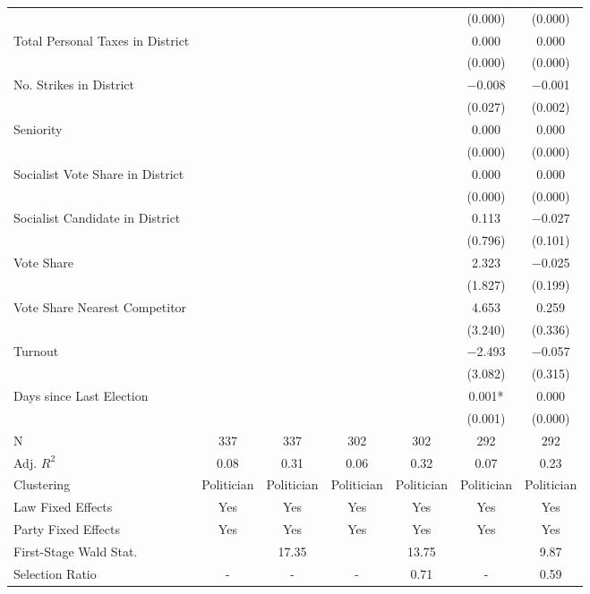 \begin{table}[!h]
{\begin{threeparttable}
\begin{tabular}[t]{lcccccc}
 &  &  &  &  & (\num{0.000}) & \vphantom{3} (\num{0.000})\\
Total Personal Taxes in District &  &  &  &  & \num{0.000} & \num{0.000}\\
 &  &  &  &  & (\num{0.000}) & \vphantom{2} (\num{0.000})\\
No. Strikes in District &  &  &  &  & \num{-0.008} & \num{-0.001}\\
 &  &  &  &  & (\num{0.027}) & (\num{0.002})\\
Seniority &  &  &  &  & \num{0.000} & \num{0.000}\\
 &  &  &  &  & (\num{0.000}) & \vphantom{1} (\num{0.000})\\
Socialist Vote Share in District &  &  &  &  & \num{0.000} & \num{0.000}\\
 &  &  &  &  & (\num{0.000}) & (\num{0.000})\\
Socialist Candidate in District &  &  &  &  & \num{0.113} & \num{-0.027}\\
 &  &  &  &  & (\num{0.796}) & (\num{0.101})\\
Vote Share &  &  &  &  & \num{2.323} & \num{-0.025}\\
 &  &  &  &  & (\num{1.827}) & (\num{0.199})\\
Vote Share Nearest Competitor &  &  &  &  & \num{4.653} & \num{0.259}\\
 &  &  &  &  & (\num{3.240}) & (\num{0.336})\\
Turnout &  &  &  &  & \num{-2.493} & \num{-0.057}\\
 &  &  &  &  & (\num{3.082}) & (\num{0.315})\\
Days since Last Election &  &  &  &  & \num{0.001}* & \num{0.000}\\
 &  &  &  &  & (\num{0.001}) & (\num{0.000})\\
\midrule
N & \num{337} & \num{337} & \num{302} & \num{302} & \num{292} & \num{292}\\
Adj. $R^2$ & \num{0.08} & \num{0.31} & \num{0.06} & \num{0.32} & \num{0.07} & \num{0.23}\\
Clustering & Politician & Politician & Politician & Politician & Politician & Politician\\
Law Fixed Effects & Yes & Yes & Yes & Yes & Yes & Yes\\
Party Fixed Effects & Yes & Yes & Yes & Yes & Yes & Yes\\
First-Stage Wald Stat. &  & 17.35 &  & 13.75 &  & 9.87\\
Selection Ratio & - & - & - & 0.71 & - & 0.59\\

\end{tabular}
\end{threeparttable}}
\end{table}
